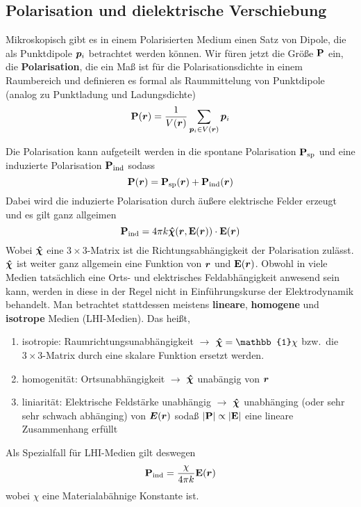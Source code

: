 \subsection{Polarisation und dielektrische Verschiebung}%
\label{sub:Polarisation}
Mikroskopisch gibt es in einem Polarisierten Medium einen Satz von Dipole,
die als Punktdipole $\vb*p_i$ betrachtet werden können. Wir füren jetzt die
Größe $\vb P$ ein, die \textbf{Polarisation}, die ein Maß ist für die 
Polarisationsdichte in einem Raumbereich und definieren es formal als 
Raummittelung von Punktdipole (analog zu Punktladung und Ladungsdichte) 
\begin{equation}
  \vb P(\vb*r) = \frac{1}{V(\vb*r)}\sum_{\vb*p_i\in V(\vb*r)} \vb*p_i
\end{equation}

Die Polarisation kann aufgeteilt werden in die spontane Polarisation 
$\vb P_\text{sp}$ und eine induzierte Polarisation $\vb P_\text{ind}$ sodass
\begin{equation}
  \vb P(\vb*r) = \vb P_\text{sp}(\vb*r) + \vb P_\text{ind}(\vb*r)
\end{equation}
Dabei wird die induzierte Polarisation durch äußere elektrische Felder erzeugt
und es gilt ganz allgeimen
\begin{equation}
  \vb P_\text{ind} = 4\pi k \vu*\chi\qty(\vb*r, \vb E(\vb*r))\cdot \vb E(\vb*r)
\end{equation}
Wobei $\vu*\chi$ eine $3\times3$-Matrix ist die Richtungsabhängigkeit der
Polarisation zulässt. $\vu*\chi$ ist weiter ganz allgemein eine Funktion
von $\vb*r$ und $\vb E(\vb*r)$. Obwohl in viele Medien tatsächlich eine Orts-
und elektrisches Feldabhängigkeit anwesend sein kann, werden in diese in
der Regel nicht in Einführungskurse der Elektrodynamik behandelt. Man 
betrachtet stattdessen meistens \textbf{lineare}, \textbf{homogene} und 
\textbf{isotrope} Medien (LHI-Medien). Das heißt,
\begin{enumerate}
  \item isotropie: Raumrichtungsunabhängigkeit $\rightarrow$ 
    $\vu*\chi=\mathbb{1}\chi$ bzw.\ die $3\times3$-Matrix 
    durch eine skalare Funktion ersetzt werden.
  \item homogenität: Ortsunabhängigkeit $\rightarrow$ 
    $\vu*\chi$ unabängig von $\vb*r$
  \item liniarität: Elektrische Feldstärke unabhängig $\rightarrow$
    $\vu*\chi$ unabhänging (oder sehr sehr schwach abhänging) 
    von $\vb*E(\vb*r)$ sodaß $\abs{\vb P} 
    \propto \abs{\vb E}$ eine lineare Zusammenhang erfüllt
\end{enumerate}
Als Spezialfall für LHI-Medien gilt deswegen
\begin{equation}
  \vb P_\text{ind} = \frac{\chi}{4\pi k} \vb E(\vb*r)
\end{equation}
wobei $\chi$ eine Materialabähnige Konstante ist.

